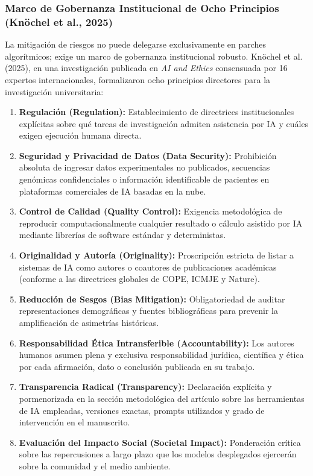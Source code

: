 \subsubsection{Marco de Gobernanza Institucional de Ocho Principios (Knöchel et al., 2025)}

La mitigación de riesgos no puede delegarse exclusivamente en parches algorítmicos; exige un marco de gobernanza institucional robusto. Knöchel et al. (2025), en una investigación publicada en \textit{AI and Ethics} consensuada por 16 expertos internacionales, formalizaron ocho principios directores para la investigación universitaria:

\begin{enumerate}
    \item \textbf{Regulación (Regulation):} Establecimiento de directrices institucionales explícitas sobre qué tareas de investigación admiten asistencia por IA y cuáles exigen ejecución humana directa.
    \item \textbf{Seguridad y Privacidad de Datos (Data Security):} Prohibición absoluta de ingresar datos experimentales no publicados, secuencias genómicas confidenciales o información identificable de pacientes en plataformas comerciales de IA basadas en la nube.
    \item \textbf{Control de Calidad (Quality Control):} Exigencia metodológica de reproducir computacionalmente cualquier resultado o cálculo asistido por IA mediante librerías de software estándar y deterministas.
    \item \textbf{Originalidad y Autoría (Originality):} Proscripción estricta de listar a sistemas de IA como autores o coautores de publicaciones académicas (conforme a las directrices globales de COPE, ICMJE y Nature).
    \item \textbf{Reducción de Sesgos (Bias Mitigation):} Obligatoriedad de auditar representaciones demográficas y fuentes bibliográficas para prevenir la amplificación de asimetrías históricas.
    \item \textbf{Responsabilidad Ética Intransferible (Accountability):} Los autores humanos asumen plena y exclusiva responsabilidad jurídica, científica y ética por cada afirmación, dato o conclusión publicada en su trabajo.
    \item \textbf{Transparencia Radical (Transparency):} Declaración explícita y pormenorizada en la sección metodológica del artículo sobre las herramientas de IA empleadas, versiones exactas, prompts utilizados y grado de intervención en el manuscrito.
    \item \textbf{Evaluación del Impacto Social (Societal Impact):} Ponderación crítica sobre las repercusiones a largo plazo que los modelos desplegados ejercerán sobre la comunidad y el medio ambiente.
\end{enumerate}

